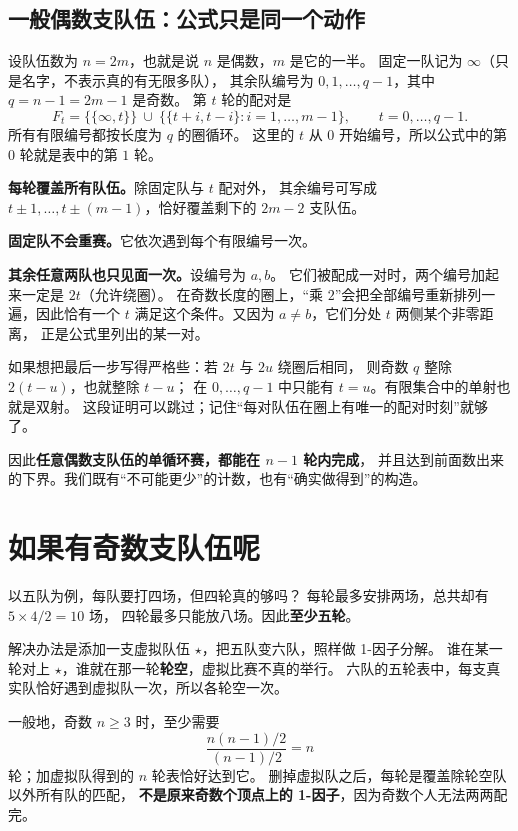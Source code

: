 \documentclass[UTF8,11pt,fontset=none]{ctexart}
\begin{document}
\subsection{一般偶数支队伍：公式只是同一个动作}
设队伍数为 $n=2m$，也就是说 $n$ 是偶数，$m$ 是它的一半。
固定一队记为 $\infty$（只是名字，不表示真的有无限多队），
其余队编号为 $0,1,\dots,q-1$，其中 $q=n-1=2m-1$ 是奇数。
第 $t$ 轮的配对是
\[
F_t=\{\{\infty,t\}\}\ \cup\
\bigl\{\{t+i,t-i\}:i=1,\dots,m-1\bigr\},
\qquad t=0,\dots,q-1.
\]
所有有限编号都按长度为 $q$ 的圈循环。
这里的 $t$ 从 $0$ 开始编号，所以公式中的第 $0$ 轮就是表中的第 $1$ 轮。

\begin{keybox}[为什么它真的不漏、不重]
\textbf{每轮覆盖所有队伍。}除固定队与 $t$ 配对外，
其余编号可写成 $t\pm1,\dots,t\pm(m-1)$，恰好覆盖剩下的 $2m-2$ 支队伍。

\textbf{固定队不会重赛。}它依次遇到每个有限编号一次。

\textbf{其余任意两队也只见面一次。}设编号为 $a,b$。
它们被配成一对时，两个编号加起来一定是 $2t$（允许绕圈）。
在奇数长度的圈上，“乘 $2$”会把全部编号重新排列一遍，因此恰有一个 $t$
满足这个条件。又因为 $a\ne b$，它们分处 $t$ 两侧某个非零距离，
正是公式里列出的某一对。
\end{keybox}
如果想把最后一步写得严格些：若 $2t$ 与 $2u$ 绕圈后相同，
则奇数 $q$ 整除 $2(t-u)$，也就整除 $t-u$；
在 $0,\dots,q-1$ 中只能有 $t=u$。有限集合中的单射也就是双射。
这段证明可以跳过；记住“每对队伍在圈上有唯一的配对时刻”就够了。

因此\textbf{任意偶数支队伍的单循环赛，都能在 $n-1$ 轮内完成}，
并且达到前面数出来的下界。我们既有“不可能更少”的计数，也有“确实做得到”的构造。

\section{如果有奇数支队伍呢}
以五队为例，每队要打四场，但四轮真的够吗？
每轮最多安排两场，总共却有 $5\times4/2=10$ 场，
四轮最多只能放八场。因此\textbf{至少五轮}。

解决办法是添加一支虚拟队伍 $\star$，把五队变六队，照样做 1-因子分解。
谁在某一轮对上 $\star$，谁就在那一轮\textbf{轮空}，虚拟比赛不真的举行。
六队的五轮表中，每支真实队恰好遇到虚拟队一次，所以各轮空一次。

一般地，奇数 $n\ge3$ 时，至少需要
\[
\frac{n(n-1)/2}{(n-1)/2}=n
\]
轮；加虚拟队得到的 $n$ 轮表恰好达到它。
删掉虚拟队之后，每轮是覆盖除轮空队以外所有队的匹配，
\textbf{不是原来奇数个顶点上的 1-因子}，因为奇数个人无法两两配完。
\end{document}
